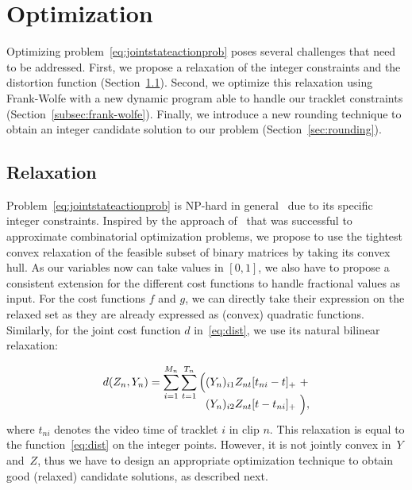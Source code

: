 \section{Optimization}
\label{sec:optim}

Optimizing problem~\eqref{eq:jointstateactionprob} poses several challenges that need to be addressed.
First, we propose a relaxation of the integer constraints and the distortion function (Section~\ref{sec:relax}).
Second, we optimize this relaxation using Frank-Wolfe with a new dynamic program able to handle our tracklet constraints (Section~\ref{subsec:frank-wolfe}).
Finally, we introduce a new rounding technique to obtain an integer candidate solution to our problem (Section~\ref{sec:rounding}).

%
%
%
%

\subsection{Relaxation}
\label{sec:relax}
Problem~\eqref{eq:jointstateactionprob} is NP-hard in general~\cite{loiola07qap} due to its specific integer constraints.
%
Inspired by the approach of~\cite{Bojanowski14weakly} that was successful to approximate combinatorial optimization problems, we propose to use the tightest convex relaxation of the feasible subset of binary matrices by taking its convex hull.
As our variables now can take values in $[0,1]$, we also have to propose a consistent extension for the different cost functions to handle fractional values as input.
For the cost functions $f$ and $g$, we can directly take their expression on the relaxed set as they are already expressed as (convex) quadratic functions.
Similarly, for the joint cost function $d$ in~\eqref{eq:dist}, we use its natural bilinear relaxation:


\vspace{-3mm}
\begin{align}
d(Z_n,Y_n) = \sum_{i=1}^{M_n} \sum_{t=1}^{T_n}  \Big( &(Y_n)_{i1} Z_{nt} [t_{ni}-t]_+ \,\, + \notag \\[-3mm]
&(Y_n)_{i2} Z_{nt} [t-t_{ni}]_+ \,\, \Big),
\label{eq:relaxeddist}
\end{align}
where $t_{ni}$ denotes the video time of tracklet $i$ in clip $n$.
This relaxation is equal to the function~\eqref{eq:dist} on the integer points.
However, it is not jointly convex in~$Y$ and~$Z$, thus we have to design an appropriate optimization technique to obtain good (relaxed) candidate solutions, as described next.


